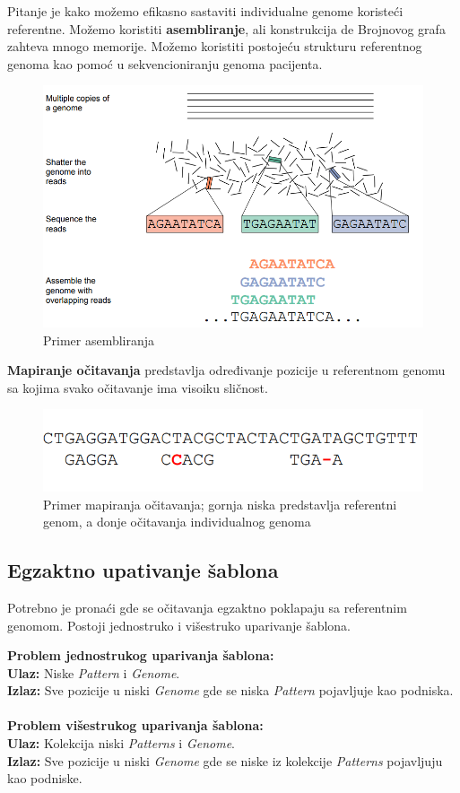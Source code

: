 Pitanje je kako možemo efikasno sastaviti individualne genome koristeći referentne. Možemo koristiti \textbf{asembliranje}, ali konstrukcija de Brojnovog grafa zahteva mnogo memorije. Možemo koristiti postojeću strukturu referentnog genoma kao pomoć u sekvencioniranju genoma pacijenta.
\begin{figure}[h!]
\centering
\includegraphics[scale=0.5]{poglavlja/9/slike/asembliranje.png}
\caption{Primer asembliranja}
\label{slika:X}
\end{figure}
\newpage
\textbf{Mapiranje očitavanja} predstavlja određivanje pozicije u referentnom genomu sa kojima svako očitavanje ima visoiku sličnost.

\begin{figure}[h!]
\centering
\includegraphics[scale=0.5]{poglavlja/9/slike/mapiranjeOcitavanja.png}
\caption{Primer mapiranja očitavanja; gornja niska predstavlja referentni genom, a donje očitavanja individualnog genoma}
\label{slika:X}
\end{figure}

\subsection{Egzaktno upativanje šablona}
Potrebno je pronaći gde se očitavanja egzaktno poklapaju sa referentnim genomom. Postoji jednostruko i višestruko uparivanje šablona.

\textbf{Problem jednostrukog uparivanja šablona:} \\
\indent \textbf{Ulaz:} Niske \textit{Pattern} i \textit{Genome}. \\
\indent \textbf{Izlaz:} Sve pozicije u niski \textit{Genome} gde se niska \textit{Pattern} pojavljuje kao podniska.
\\\\
\textbf{Problem višestrukog uparivanja šablona:} \\
\indent \textbf{Ulaz:} Kolekcija niski \textit{Patterns} i \textit{Genome}. \\
\indent \textbf{Izlaz:} Sve pozicije u niski \textit{Genome} gde se niske iz kolekcije \textit{Patterns} pojavljuju kao podniske.

